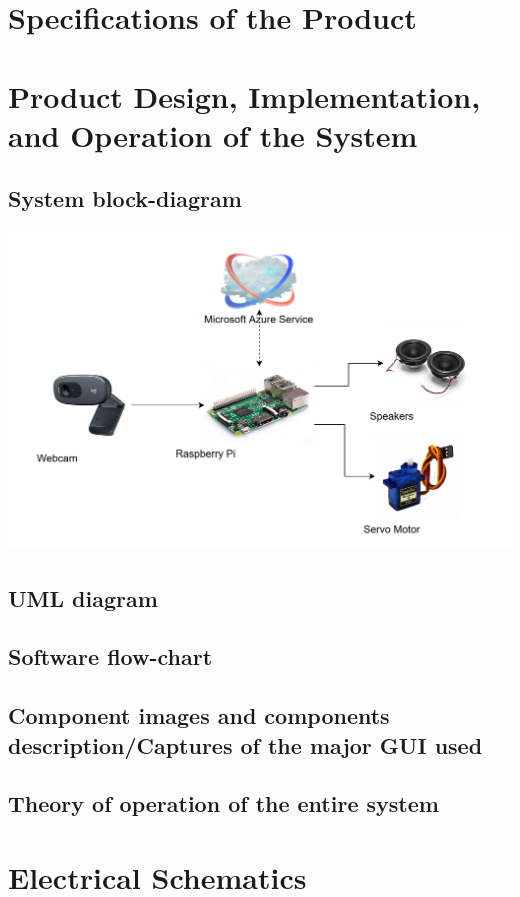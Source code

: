 \documentclass[a4paper,12pt]{article}
\begin{document}
\newpage
\section{Specifications of the Product}

\section{Product Design, Implementation, and Operation of the System}

\subsection{System block-diagram}
\includegraphics[width = \linewidth]{../images/BlockDiagram.png}
\subsection{UML diagram}
\subsection{Software flow-chart}

\subsection{Component images and components description/Captures of the major GUI used}

\subsection{Theory of operation of the entire system}

\newpage
\appendix
\section{Electrical Schematics}
\end{document}
